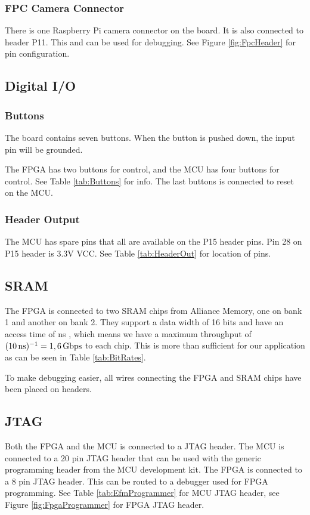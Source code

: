\subsubsection{FPC Camera Connector}
There is one Raspberry Pi camera connector on the board.
It is also connected to header P11.
This and can be used for debugging.
See Figure \ref{fig:FpcHeader} for pin configuration.

\subsection{Digital I/O}
\subsubsection{Buttons}
The board contains seven buttons.
When the button is pushed down, the input pin will be grounded.

The FPGA has two buttons for control, and the MCU has four buttons for control.
See Table \ref{tab:Buttons} for info.
The last buttons is connected to reset on the MCU.

\subsubsection{Header Output}
The MCU has spare pins that all are available on the P15 header pins.
Pin 28 on P15 header is 3.3V VCC.
See Table \ref{tab:HeaderOut} for location of pins.

\subsection{SRAM}
\label{subsec:sram}
The FPGA is connected to two SRAM chips from Alliance Memory, one on bank 1 and another on bank 2.
They support a data width of 16 bits and have an access time of \unit[10]{ns} \cite{sramdatasheet}, which means we have a maximum throughput of $(\unit[10]{ns})^{-1} = \unit[1,6]{Gbps}$ to each chip.
This is more than sufficient for our application as can be seen in Table \ref{tab:BitRates}.

To make debugging easier, all wires connecting the FPGA and SRAM chips have been placed on headers.

\subsection{JTAG}
Both the FPGA and the MCU is connected to a JTAG header.
The MCU is connected to a 20 pin JTAG header that can be used with the generic programming header from the MCU development kit.
The FPGA is connected to a 8 pin JTAG header. This can be routed to a debugger used for FPGA programming.
See Table \ref{tab:EfmProgrammer} for MCU JTAG header, see Figure \ref{fig:FpgaProgrammer} for FPGA JTAG header.

